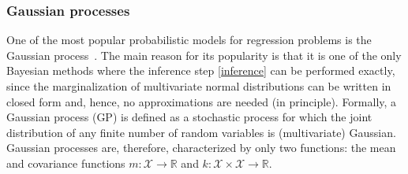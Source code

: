 \documentclass[smallcondensed]{svjour3}
\begin{document}
\subsubsection*{Gaussian processes}

    One of the most popular probabilistic models for regression problems is the Gaussian process~\cite{williams1996gaussian}. The main reason for its popularity is that it is one of the only Bayesian methods where the inference step \eqref{inference} can be performed exactly, since the marginalization of multivariate normal distributions can be written in closed form and, hence, no approximations are needed (in principle). Formally, a Gaussian process (GP) is defined as a stochastic process
    for which the joint distribution of any finite number of random variables is (multivariate) Gaussian. Gaussian processes are, therefore, characterized by only two functions: the mean and covariance functions $m:\mathcal{X}\rightarrow\mathbb{R}$ and $k:\mathcal{X}\times\mathcal{X}\rightarrow\mathbb{R}$.
\end{document}

